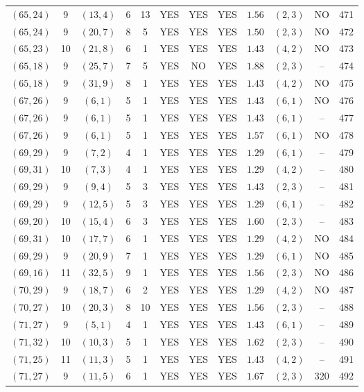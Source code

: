 \begin{longtable}{|c|c|c|c|c|c|c|c|c|c|c|c|}
$(65,24)$ & 9 & $(13,4)$ & 6 & 13 & YES & YES & YES & $1.56$ & $(2,3)$ & NO & 471\\
$(65,24)$ & 9 & $(20,7)$ & 8 & 5 & YES & YES & YES & $1.50$ & $(2,3)$ & NO & 472\\
$(65,23)$ & 10 & $(21,8)$ & 6 & 1 & YES & YES & YES & $1.43$ & $(4,2)$ & NO & 473\\
$(65,18)$ & 9 & $(25,7)$ & 7 & 5 & YES & NO & YES & $1.88$ & $(2,3)$ & -- & 474\\
$(65,18)$ & 9 & $(31,9)$ & 8 & 1 & YES & YES & YES & $1.43$ & $(4,2)$ & NO & 475\\
$(67,26)$ & 9 & $(6,1)$ & 5 & 1 & YES & YES & YES & $1.43$ & $(6,1)$ & NO & 476\\
$(67,26)$ & 9 & $(6,1)$ & 5 & 1 & YES & YES & YES & $1.43$ & $(6,1)$ & -- & 477\\
$(67,26)$ & 9 & $(6,1)$ & 5 & 1 & YES & YES & YES & $1.57$ & $(6,1)$ & NO & 478\\
$(69,29)$ & 9 & $(7,2)$ & 4 & 1 & YES & YES & YES & $1.29$ & $(6,1)$ & -- & 479\\
$(69,31)$ & 10 & $(7,3)$ & 4 & 1 & YES & YES & YES & $1.29$ & $(4,2)$ & -- & 480\\
$(69,29)$ & 9 & $(9,4)$ & 5 & 3 & YES & YES & YES & $1.43$ & $(2,3)$ & -- & 481\\
$(69,29)$ & 9 & $(12,5)$ & 5 & 3 & YES & YES & YES & $1.29$ & $(6,1)$ & -- & 482\\
$(69,20)$ & 10 & $(15,4)$ & 6 & 3 & YES & YES & YES & $1.60$ & $(2,3)$ & -- & 483\\
$(69,31)$ & 10 & $(17,7)$ & 6 & 1 & YES & YES & YES & $1.29$ & $(4,2)$ & NO & 484\\
$(69,29)$ & 9 & $(20,9)$ & 7 & 1 & YES & YES & YES & $1.29$ & $(6,1)$ & NO & 485\\
$(69,16)$ & 11 & $(32,5)$ & 9 & 1 & YES & YES & YES & $1.56$ & $(2,3)$ & NO & 486\\
$(70,29)$ & 9 & $(18,7)$ & 6 & 2 & YES & YES & YES & $1.29$ & $(4,2)$ & NO & 487\\
$(70,27)$ & 10 & $(20,3)$ & 8 & 10 & YES & YES & YES & $1.56$ & $(2,3)$ & -- & 488\\
$(71,27)$ & 9 & $(5,1)$ & 4 & 1 & YES & YES & YES & $1.43$ & $(6,1)$ & -- & 489\\
$(71,32)$ & 10 & $(10,3)$ & 5 & 1 & YES & YES & YES & $1.62$ & $(2,3)$ & -- & 490\\
$(71,25)$ & 11 & $(11,3)$ & 5 & 1 & YES & YES & YES & $1.43$ & $(4,2)$ & -- & 491\\
$(71,27)$ & 9 & $(11,5)$ & 6 & 1 & YES & YES & YES & $1.67$ & $(2,3)$ & 320 & 492\\

\end{longtable}
